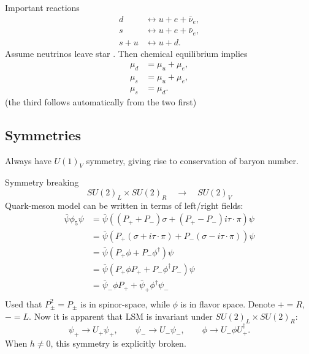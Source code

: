 Important reactions
\begin{subequations}
\begin{align}
	d     &\leftrightarrow u + e + \bar{\nu}_e, \\
	s     &\leftrightarrow u + e + \bar{\nu}_e, \\
	s + u &\leftrightarrow u + d .
\end{align}
\end{subequations}
Assume neutrinos leave star .
Then chemical equilibrium implies
\begin{subequations}
\begin{align}
	\mu_d &= \mu_u + \mu_e, \\
	\mu_s &= \mu_u + \mu_e, \\
	\mu_s &= \mu_d .
\end{align}
\label{eq:lsm:chemical_equilibrium}
\end{subequations}
(the third follows automatically from the two first)

\subsection{Symmetries}

Always have $U(1)_V$ symmetry, giving rise to conservation of baryon number.

Symmetry breaking
\begin{equation}
	SU(2)_L \times SU(2)_R \quad \rightarrow \quad SU(2)_V
\end{equation}
Quark-meson model can be written in terms of left/right fields:
\begin{equation}
\begin{split}
	\bar{\psi} \phi_5 \psi &= \bar{\psi} ( (P_+ + P_-) \sigma + (P_+ - P_-) i \tau \cdot \pi) \psi \\
	                       &= \bar{\psi} ( P_+ (\sigma + i \tau \cdot \pi) + P_- (\sigma - i \tau \cdot \pi) ) \psi \\
	                       &= \bar{\psi} ( P_+ \phi + P_- \phi^\dagger) \psi \\
	                       &= \bar{\psi} ( P_+ \phi P_+ + P_- \phi^\dagger P_-) \psi \\
	                       &= \bar{\psi}_- \phi P_+ + \bar{\psi}_+ \phi^\dagger \psi_- \\
\end{split}
\end{equation}
Used that $P_\pm^2 = P_\pm$ is in spinor-space, while $\phi$ is in flavor space.
Denote $+ = R$, $- = L$.
Now it is apparent that LSM is invariant under $SU(2)_L \times SU(2)_R$:
\begin{equation}
	\psi_+ \rightarrow U_+ \psi_+, \qquad
	\psi_- \rightarrow U_- \psi_-, \qquad
	\phi   \rightarrow U_- \phi U_+^\dagger.
\end{equation}
When $h \neq 0$, this symmetry is explicitly broken.



